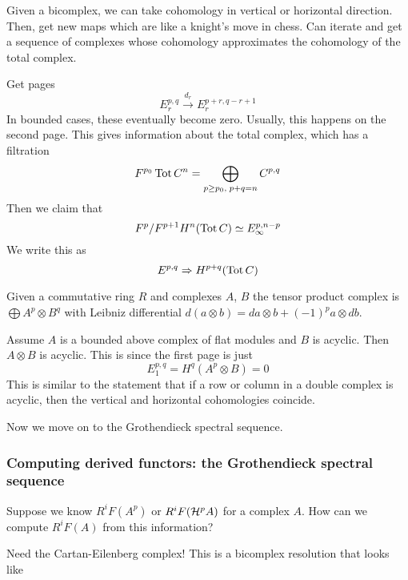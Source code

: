 
Given a bicomplex, we can take cohomology in vertical or horizontal direction. Then, get new maps which are like a knight's move in chess. Can iterate and get a sequence of complexes whose cohomology approximates the cohomology of the total complex.

Get pages
\begin{equation*}
    E_r^{p,q} \xrightarrow{d_r} E_r^{p+r,q-r+1}
\end{equation*}
In bounded cases, these eventually become zero. Usually, this happens on the second page. This gives information about the total complex, which has a filtration
\begin{equation*}
    F^{p_0}\operatorname{Tot} C^n = \bigoplus_{p\geq p_0,\;p+q=n} C^{p,q}
\end{equation*}
Then we claim that
\begin{equation*}
    F^p/F^{p+1}H^n(\operatorname{Tot} C) \simeq E_\infty^{p,n-p}
\end{equation*}
We write this as
\begin{equation*}
    E^{p,q} \Rightarrow H^{p+q}(\operatorname{Tot} C)
\end{equation*}

Given a commutative ring $R$ and complexes $A$, $B$ the tensor product complex is $\bigoplus A^p\otimes B^q$ with Leibniz differential $d(a\otimes b)=da\otimes b + (-1)^p a\otimes db$.

Assume $A$ is a bounded above complex of flat modules and $B$ is acyclic. Then $A\otimes B$ is acyclic. This is since the first page is just
\begin{equation*}
    E_1^{p,q} = H^q(A^p\otimes B) = 0
\end{equation*}
This is similar to the statement that if a row or column in a double complex is acyclic, then the vertical and horizontal cohomologies coincide.

Now we move on to the Grothendieck spectral sequence.

\subsubsection{Computing derived functors: the Grothendieck spectral sequence}

Suppose we know $R^iF(A^p)$ or $R^iF(\mathcal{H}^pA)$ for a complex $A$. How can we compute $R^iF(A)$ from this information?

Need the Cartan-Eilenberg complex! This is a bicomplex resolution that looks like %

